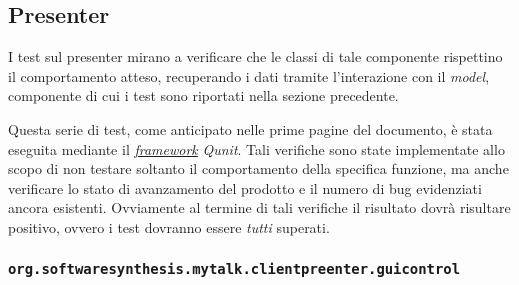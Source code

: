 \subsection{Presenter}
I test sul presenter mirano a verificare che le classi di tale componente rispettino il comportamento atteso, recuperando i dati tramite l'interazione con il \textit{model}, componente di cui i test sono riportati nella sezione precedente.

Questa serie di test, come anticipato nelle prime pagine del documento, è stata eseguita mediante il \underline{\textit{framework}} \textit{Qunit}. Tali verifiche sono state implementate allo scopo di non testare soltanto il comportamento della specifica funzione, ma anche verificare lo stato di avanzamento del prodotto e il numero di bug evidenziati ancora esistenti.
Ovviamente al termine di tali verifiche il risultato dovrà risultare positivo, ovvero i test dovranno essere \textit{tutti} superati.

\subsubsection{\texttt{org.softwaresynthesis.mytalk.clientpreenter.guicontrol}}

